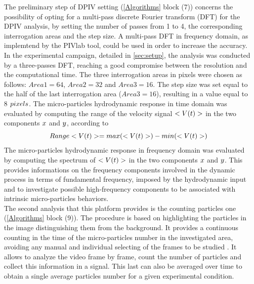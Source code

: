 \documentclass[journal]{IEEEtran}
\theoremstyle{definition}
\theoremstyle{remark}
\begin{document}
The preliminary step of DPIV setting (\fig\ref{Algorithms} block (7)) concerns the possibility of opting for a multi-pass discrete Fourier transform (DFT) for the DPIV analysis, by setting the number of passes from 1 to 4, the corresponding interrogation areas and the step size.
A multi-pass DFT in frequency domain, as implemtend by the PIVlab tool, could be used in order to increase the accuracy. In the experimental campaign, detailed in \sect\ref{sec:setup}, the analysis was conducted by a three-passes DFT, reaching a good compromise between the resolution and the computational time. The three interrogation areas in pixels were chosen as follows: $Area1=64$, $Area2=32$ and $Area3=16$. The step size was set equal to the half of the last interrogation area ($Area3=16$), resulting in a value equal to 8 $pixels$.
The micro-particles hydrodynamic response in time domain was evaluated by computing the range of the velocity signal $<V(t)>$ in the two components $x$ and $y$, according to 
\begin{equation}
	\label{eqn:range}
	Range\meann=max(\meann)-min(\meann)
\end{equation}
The micro-particles hydrodynamic response in frequency domain was evaluated by computing the spectrum of $<V(t)>$ in the two components $x$ and $y$. This provides informations on the frequency components involved in the dynamic process in terms of fundamental frequency, imposed by the hydrodynamic input and to investigate possible high-frequency components to be associated with intrinsic micro-particles behaviors.
\\The second analysis that this platform provides is the counting particles one (\fig\ref{Algorithms} block (9)). The procedure is based on highlighting the particles in the image distinguishing them from the background. It provides a continuous counting in the time of the micro-particles number in the investigated area, avoiding any manual and individual selecting of the frames to be studied . It allows to analyze the video frame by frame, count the number of particles and collect this information in a signal. This last can also be averaged over time to obtain a single average particles number for a given experimental condition.
\end{document}
